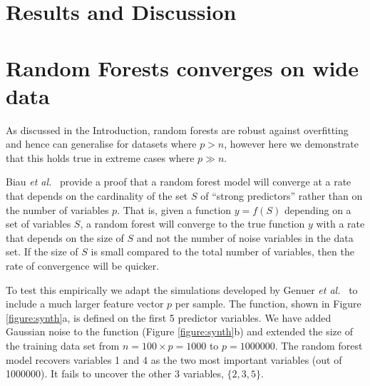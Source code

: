 \documentclass[10pt,letterpaper]{article}
\begin{document}
\section*{Results and Discussion}




\section*{Random Forests converges on wide data}

As discussed in the Introduction, random forests are robust against overfitting and hence can generalise for datasets
where $p > n$, however here we demonstrate that this holds true in extreme cases where $p \gg n$.

Biau {\it et al.}~\cite{Biau.2012} provide a proof that a random forest model will converge at a rate that depends on
the cardinality of the set $S$ of ``strong predictors'' rather than on the number of variables $p$. That is, given a
function $y=f(S)$ depending on a set of variables $S$, a random forest will converge to the true function $y$ with a
rate that depends on the size of $S$ and not the number of noise variables in the data set. If the size of $S$ is small
compared to the total number of variables, then the rate of convergence will be quicker.

To test this empirically we adapt the simulations developed by Genuer {\it et al.}~\cite{Genuer.et.al.2010} to include a
much larger feature vector $p$ per sample.  The function, shown in Figure \ref{figure:synth}a, is defined on the first 5
predictor variables. We have added Gaussian noise to the function (Figure \ref{figure:synth}b) and extended the size of
the training data set from $n=100 \times p=1000$ to $p=1000000$.
The random forest model recovers variables 1 and 4 as the two
most important variables (out of 1000000). It fails to uncover the other 3 variables, $\{2,3,5\}$.
\end{document}
